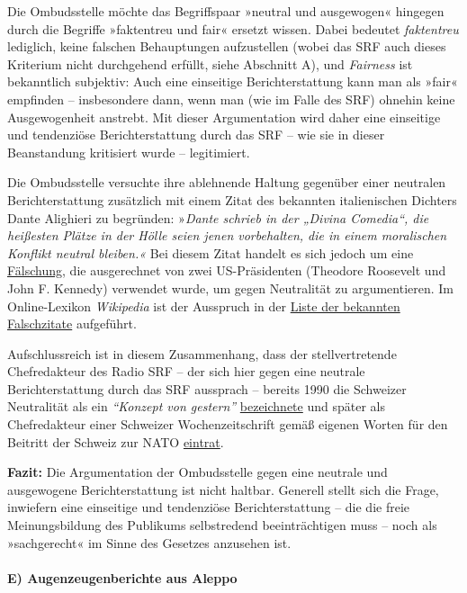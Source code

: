 Die Ombudsstelle möchte das Begriffspaar »neutral und ausgewogen«
hingegen durch die Begriffe »faktentreu und fair« ersetzt wissen. Dabei
bedeutet \emph{faktentreu} lediglich, keine falschen Behauptungen
aufzustellen (wobei das SRF auch dieses Kriterium nicht durchgehend
erfüllt, siehe Abschnitt A), und \emph{Fairness} ist bekanntlich
subjektiv: Auch eine einseitige Berichterstattung kann man als »fair«
empfinden -- insbesondere dann, wenn man (wie im Falle des SRF) ohnehin
keine Ausgewogenheit anstrebt. Mit dieser Argumentation wird daher eine
einseitige und tendenziöse Berichterstattung durch das SRF -- wie sie in
dieser Beanstandung kritisiert wurde -- legitimiert.

Die Ombudsstelle versuchte ihre ablehnende Haltung gegenüber einer
neutralen Berichterstattung zusätzlich mit einem Zitat des bekannten
italienischen Dichters Dante Alighieri zu begründen: »\emph{Dante
schrieb in der „Divina Comedia``, die heißesten Plätze in der Hölle
seien jenen vorbehalten, die in einem moralischen Konflikt neutral
bleiben.«} Bei diesem Zitat handelt es sich jedoch um eine
\href{http://quoteinvestigator.com/2015/01/14/hottest/}{Fälschung}, die
ausgerechnet von zwei US-Präsidenten (Theodore Roosevelt und John F.
Kennedy) verwendet wurde, um gegen Neutralität zu argumentieren. Im
Online-Lexikon \emph{Wikipedia} ist der Ausspruch in der
\href{https://en.wikiquote.org/wiki/List_of_misquotations}{Liste der
bekannten Falschzitate} aufgeführt.

Aufschlussreich ist in diesem Zusammenhang, dass der stellvertretende
Chefredakteur des Radio SRF -- der sich hier gegen eine neutrale
Berichterstattung durch das SRF aussprach -- bereits 1990 die Schweizer
Neutralität als ein \emph{``Konzept von gestern''}
\href{http://www.zeit.de/1990/44/ein-konzept-von-gestern}{bezeichnete}
und später als Chefredakteur einer Schweizer Wochenzeitschrift gemäß
eigenen Worten für den Beitritt der Schweiz zur NATO
\href{https://web.archive.org/web/20040722094101/http://www.weltwoche.ch/artikel/?AssetID=400\&CategoryID=60}{eintrat}.

\textbf{Fazit:} Die Argumentation der Ombudsstelle gegen eine neutrale
und ausgewogene Berichterstattung ist nicht haltbar. Generell stellt
sich die Frage, inwiefern eine einseitige und tendenziöse
Berichterstattung -- die die freie Meinungsbildung des Publikums
selbstredend beeinträchtigen muss -- noch als »sachgerecht« im Sinne des
Gesetzes anzusehen ist.

\hypertarget{e-augenzeugenberichte-aus-aleppo}{%
\paragraph{E) Augenzeugenberichte aus
Aleppo}\label{e-augenzeugenberichte-aus-aleppo}}

